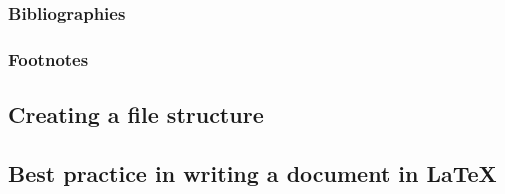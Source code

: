 \subsubsection{Bibliographies}
\label{sec:Bibliographies}


\subsubsection{Footnotes}


\subsection{Creating a file structure}
\label{sec:FileStructure}


\subsection{Best practice in writing a document in LaTeX}
